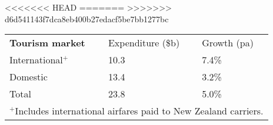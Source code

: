 <<<<<<< HEAD
=======
>>>>>>> d6d541143f7dca8eb400b27edacf5be7bb1277bc
\begin{tabular}[t]{p{4.45cm}>{\hfill}p{1.7cm}>{\hfill}p{1.35cm}}
 \textbf{Tourism market} & Expenditure (\$b) & Growth (pa) \\ 
 International$^+$ & 10.3 & 7.4\% \\ 
  Domestic & 13.4 & 3.2\% \\ 
  Total & 23.8 & 5.0\% \\ 
  \multicolumn{3}{p{7.5cm}}{$^+$Includes international airfares paid to New Zealand carriers.}\ 
\end{tabular}
